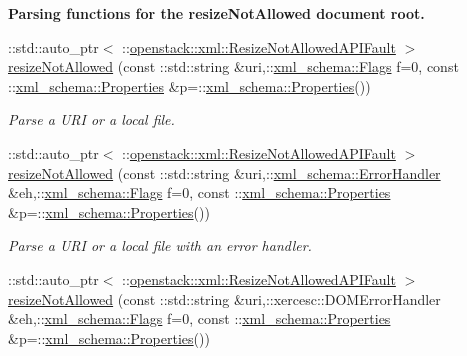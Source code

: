 \begin{Indent}{\bf Parsing functions for the resizeNotAllowed document root.}\par
\begin{DoxyCompactItemize}
\item 
::std::auto\_\-ptr$<$ ::\hyperlink{classopenstack_1_1xml_1_1ResizeNotAllowedAPIFault}{openstack::xml::ResizeNotAllowedAPIFault} $>$ \hyperlink{namespaceopenstack_1_1xml_ae8c272bdf4fde9cc9a102bb9154df547}{resizeNotAllowed} (const ::std::string \&uri,::\hyperlink{namespacexml__schema_affb4c227cbd9aa7453dd1dc5a1401943}{xml\_\-schema::Flags} f=0, const ::\hyperlink{namespacexml__schema_ad27ce19a7ee1d3b1064092648898f64c}{xml\_\-schema::Properties} \&p=::\hyperlink{namespacexml__schema_ad27ce19a7ee1d3b1064092648898f64c}{xml\_\-schema::Properties}())
\begin{DoxyCompactList}\small\item\em Parse a URI or a local file. \item\end{DoxyCompactList}\item 
::std::auto\_\-ptr$<$ ::\hyperlink{classopenstack_1_1xml_1_1ResizeNotAllowedAPIFault}{openstack::xml::ResizeNotAllowedAPIFault} $>$ \hyperlink{namespaceopenstack_1_1xml_ad53ac38f30fcf57b2e28d678074c5f0e}{resizeNotAllowed} (const ::std::string \&uri,::\hyperlink{namespacexml__schema_ab1c9361bfd3b404eaabf0c31eded79dc}{xml\_\-schema::ErrorHandler} \&eh,::\hyperlink{namespacexml__schema_affb4c227cbd9aa7453dd1dc5a1401943}{xml\_\-schema::Flags} f=0, const ::\hyperlink{namespacexml__schema_ad27ce19a7ee1d3b1064092648898f64c}{xml\_\-schema::Properties} \&p=::\hyperlink{namespacexml__schema_ad27ce19a7ee1d3b1064092648898f64c}{xml\_\-schema::Properties}())
\begin{DoxyCompactList}\small\item\em Parse a URI or a local file with an error handler. \item\end{DoxyCompactList}\item 
::std::auto\_\-ptr$<$ ::\hyperlink{classopenstack_1_1xml_1_1ResizeNotAllowedAPIFault}{openstack::xml::ResizeNotAllowedAPIFault} $>$ \hyperlink{namespaceopenstack_1_1xml_a44af7a65e21895e78b230bab2fc848c6}{resizeNotAllowed} (const ::std::string \&uri,::xercesc::DOMErrorHandler \&eh,::\hyperlink{namespacexml__schema_affb4c227cbd9aa7453dd1dc5a1401943}{xml\_\-schema::Flags} f=0, const ::\hyperlink{namespacexml__schema_ad27ce19a7ee1d3b1064092648898f64c}{xml\_\-schema::Properties} \&p=::\hyperlink{namespacexml__schema_ad27ce19a7ee1d3b1064092648898f64c}{xml\_\-schema::Properties}())

\end{DoxyCompactItemize}
\end{Indent}
